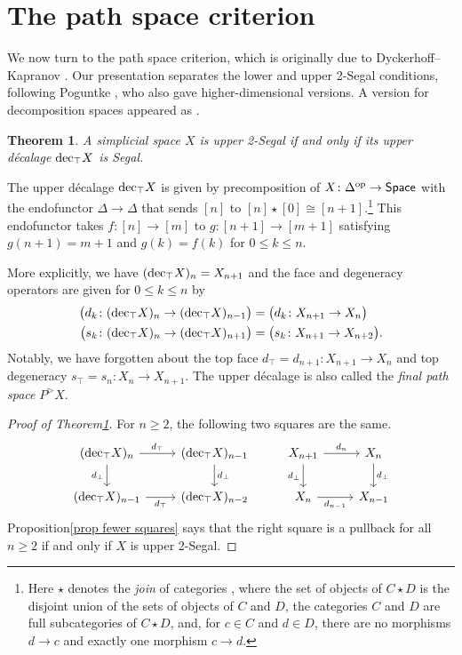 \documentclass{amsart}
\newtheorem{theorem}{Theorem}[section]
\theoremstyle{definition}
\theoremstyle{remark}
\newcommand{\spaces}{\mathsf{Space}}
\newcommand{\op}{\textup{op}}
\newcommand{\udec}{\textup{dec}_{\top}}
\begin{document}
\section{The path space criterion}\label{sec path space}

We now turn to the path space criterion, which is originally due to Dyckerhoff--Kapranov \cite[Theorem 6.3.2]{DyckerhoffKapranov:HSS}.
Our presentation separates the lower and upper 2-Segal conditions, following Poguntke \cite{Poguntke:HSSAKT}, who also gave higher-dimensional versions.
A version for decomposition spaces appeared as \cite[Theorem 4.10]{GKT1}.

\begin{theorem}\label{thm upper path}
A simplicial space $X$ is upper 2-Segal if and only if its upper d\'ecalage $\udec X$ is Segal.
\end{theorem}

The upper d\'ecalage $\udec X$ is given by precomposition of $X \colon \Delta^\op \to \spaces$ with the endofunctor $\Delta \to \Delta$ that sends $[n]$ to $[n]\star [0] \cong [n+1]$.\footnote{
Here $\star$ denotes the \emph{join} of categories \cite[\href{https://kerodon.net/tag/0160}{Tag 0160}]{kerodon}, where the set of objects of $C \star D$ is the disjoint union of the sets of objects of $C$ and $D$, the categories $C$ and $D$ are full subcategories of $C\star D$, and, for $c\in C$ and $d\in D$, there are no morphisms $d\to c$ and exactly one morphism $c\to d$.}
This endofunctor takes $f\colon [n] \to [m]$ to $g\colon [n+1] \to [m+1]$ satisfying $g(n+1) = m+1$ and $g(k) = f(k)$ for $0\leq k \leq n$.

More explicitly, we have $(\udec X)_n = X_{n+1}$ and the face and degeneracy operators are given for $0 \leq k \leq n$ by
\begin{align*} 
\big( d_k \colon (\udec X)_n \to (\udec X)_{n-1} \big) &= \big( d_k \colon X_{n+1} \to X_n \big)
\\
\big( s_k \colon (\udec X)_n \to (\udec X)_{n+1} \big) &= \big( s_k \colon X_{n+1} \to X_{n+2} \big).
\end{align*}
Notably, we have forgotten about the top face $d_\top = d_{n+1} \colon X_{n+1} \to X_n$ and top degeneracy $s_\top = s_n \colon X_n \to X_{n+1}$.
The upper d\'ecalage is also called the \emph{final path space} $P^\triangleright X$.

\begin{proof}[Proof of Theorem\nobreakspace \ref {thm upper path}]
For $n\geq 2$, the following two squares are the same.
\[ \begin{tikzcd}
(\udec X)_n \rar{d_\top} \dar[swap]{d_\bot}  & (\udec X)_{n-1} \dar{d_\bot} 
&  
X_{n+1} \rar{d_n} \dar[swap]{d_\bot}  & X_n \dar{d_\bot}
\\
(\udec X)_{n-1} \rar[swap]{d_\top} & (\udec X)_{n-2}
&  
X_n \rar[swap]{d_{n-1}} & X_{n-1}
\end{tikzcd} \]
Proposition\nobreakspace \ref {prop fewer squares} says that the right square is a pullback for all $n\geq 2$ if and only if $X$ is upper 2-Segal.
\end{proof}
\end{document}
